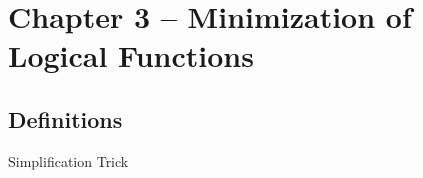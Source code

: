 \section{Chapter 3 -- Minimization of Logical Functions}


\subsection{Definitions}
\begin{description}
\item[Simplification Trick]
\end{description}


